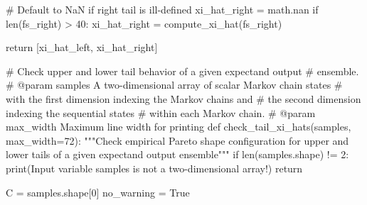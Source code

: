 \documentclass[
  letterpaper,
  DIV=11,
  numbers=noendperiod]{scrartcl}
\newenvironment{Shaded}{\begin{snugshade}}{\end{snugshade}}
\newcommand{\BuiltInTok}[1]{\textcolor[rgb]{0.00,0.23,0.31}{#1}}
\newcommand{\CommentTok}[1]{\textcolor[rgb]{0.37,0.37,0.37}{#1}}
\newcommand{\ControlFlowTok}[1]{\textcolor[rgb]{0.00,0.23,0.31}{#1}}
\newcommand{\DecValTok}[1]{\textcolor[rgb]{0.68,0.00,0.00}{#1}}
\newcommand{\KeywordTok}[1]{\textcolor[rgb]{0.00,0.23,0.31}{#1}}
\newcommand{\NormalTok}[1]{\textcolor[rgb]{0.00,0.23,0.31}{#1}}
\newcommand{\OperatorTok}[1]{\textcolor[rgb]{0.37,0.37,0.37}{#1}}
\newcommand{\StringTok}[1]{\textcolor[rgb]{0.13,0.47,0.30}{#1}}
\newcommand{\VariableTok}[1]{\textcolor[rgb]{0.07,0.07,0.07}{#1}}
\begin{document}
\begin{Shaded}
\begin{Highlighting}[]
  \CommentTok{\# Default to NaN if right tail is ill{-}defined}
\NormalTok{  xi\_hat\_right }\OperatorTok{=}\NormalTok{ math.nan}
  \ControlFlowTok{if} \BuiltInTok{len}\NormalTok{(fs\_right) }\OperatorTok{\textgreater{}} \DecValTok{40}\NormalTok{:}
\NormalTok{    xi\_hat\_right }\OperatorTok{=}\NormalTok{ compute\_xi\_hat(fs\_right)}
    
  \ControlFlowTok{return}\NormalTok{ [xi\_hat\_left, xi\_hat\_right]}

\CommentTok{\# Check upper and lower tail behavior of a given expectand output }
\CommentTok{\# ensemble.}
\CommentTok{\# @param samples A two{-}dimensional array of scalar Markov chain states }
\CommentTok{\#                with the first dimension indexing the Markov chains and }
\CommentTok{\#                the second dimension indexing the sequential states }
\CommentTok{\#                within each Markov chain.}
\CommentTok{\# @param max\_width Maximum line width for printing}
\KeywordTok{def}\NormalTok{ check\_tail\_xi\_hats(samples, max\_width}\OperatorTok{=}\DecValTok{72}\NormalTok{):}
  \CommentTok{"""Check empirical Pareto shape configuration for upper and lower }
\CommentTok{     tails of a given expectand output ensemble"""}
  \ControlFlowTok{if} \BuiltInTok{len}\NormalTok{(samples.shape) }\OperatorTok{!=} \DecValTok{2}\NormalTok{:}
    \BuiltInTok{print}\NormalTok{(}\StringTok{\textquotesingle{}Input variable \textasciigrave{}samples\textasciigrave{} is not a two{-}dimensional array!\textquotesingle{}}\NormalTok{)}
    \ControlFlowTok{return}
  
\NormalTok{  C }\OperatorTok{=}\NormalTok{ samples.shape[}\DecValTok{0}\NormalTok{]}
\NormalTok{  no\_warning }\OperatorTok{=} \VariableTok{True}
  

\end{Highlighting}
\end{Shaded}
\end{document}

